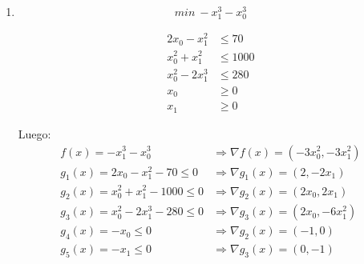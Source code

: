 \documentclass[titlepage, 11pt]{scrartcl}
\begin{document}
\begin{enumerate}
\begin{enumerate}
\begin{enumerate}
			\item \textbf{Punto} $x^* = (1.25, 2.75) = (\frac{5}{4}, \frac{11}{4})$

			El resultado obtenido en este punto fue \textbf{False}, lo que indica que no se cumple la KKT.
			
			Determinaci\'on del conjunto de \'indices activos:
			\begin{align*}
			g_1(x^*) &= x_0^2 - 2x_1 - 5 = (\frac{5}{4})^2 - 2* \frac{11}{4} - 5 \neq 0\\
			g_2(x^*) &= x_0^2 - x_1 - 100 = (\frac{5}{4})^2 - \frac{11}{4} - 100 \neq 0\\
			g_3(x^*) &= 5x_0^2 - 2 x_1^2 - 500 = 5 (\frac{5}{4})^2 - 2(\frac{11}{4})^2 - 500 \neq 0\\
			g_4(x^*) &= -x_0 = -\frac{5}{4} \neq 0\\
			g_5(x^*) &= -x_1 = -\frac{11}{4} \neq 0
			\end{align*}
			
			En este caso $I(x^*)  = \emptyset$, por tanto se cumple la condici\'on de regularidad de $x^*$, o sea, que cumple con la LICQ.
			
			El hecho de que no se cumpla la condición de KKT permite afirmar que o bien el punto no es un m\'inimo local del problema o que no se cumple la LICQ (que no se cumplan ninguna de las dos también podría es una opci\'on); en este caso, s\'i se cumple la condici\'on de regularidad, por tanto el punto $x^*$ no es un m\'inimo local del problema.
		\end{enumerate}
	
		\vspace{1cm}
	\item \begin{equation*}
	min \ -x_1^3 - x_0^3
	\end{equation*}
	
	\begin{align*}
	2x_0 - x_1^2 &\leq 70\\
	x_0^2 + x_1^2 &\leq 1000\\
	x_0^2 - 2 x_1^3 &\leq 280\\
	x_0 &\geq 0\\
	x_1 &\geq 0
	\end{align*}
	
	Luego:
	\begin{align*}
	f(x) = -x_1^3 - x_0^3 &\Rightarrow \nabla f(x) = (-3x_0^2, -3x_1^2)\\
	g_1(x) = 2x_0 - x_1^2 - 70\leq 0 &\Rightarrow \nabla g_1(x) = (2, -2x_1)\\
	g_2(x) = x_0^2 + x_1^2- 1000 \leq 0 &\Rightarrow \nabla g_2(x) = (2x_0, 2x_1)\\
	g_3(x) = x_0^2 - 2 x_1^3 - 280 \leq 0 &\Rightarrow \nabla g_3(x) = (2x_0, -6x_1^2) \\
	g_4(x) = -x_0 \leq 0 &\Rightarrow \nabla g_2(x) = (-1, 0)\\
	g_5(x) =  -x_1 \leq 0 &\Rightarrow \nabla g_3(x) = (0, -1)
	\end{align*}
	

\end{enumerate}
\end{enumerate}
\end{document}
